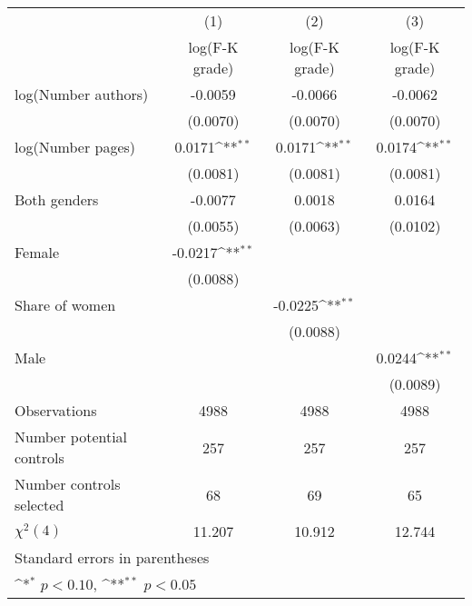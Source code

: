 {
\def\sym#1{\ifmmode^{#1}\else\(^{#1}\)\fi}
\begin{tabular}{l*{3}{c}}
\hline\hline
                    &\multicolumn{1}{c}{(1)}&\multicolumn{1}{c}{(2)}&\multicolumn{1}{c}{(3)}\\
                    &\multicolumn{1}{c}{log(F-K grade)}&\multicolumn{1}{c}{log(F-K grade)}&\multicolumn{1}{c}{log(F-K grade)}\\
\hline
\hspace{3mm}log(Number authors)&     -0.0059        &     -0.0066        &     -0.0062        \\
                    &    (0.0070)        &    (0.0070)        &    (0.0070)        \\
[1em]
\hspace{3mm}log(Number pages)&      0.0171\sym{**}&      0.0171\sym{**}&      0.0174\sym{**}\\
                    &    (0.0081)        &    (0.0081)        &    (0.0081)        \\
[1em]
\hspace{3mm}Both genders&     -0.0077        &      0.0018        &      0.0164        \\
                    &    (0.0055)        &    (0.0063)        &    (0.0102)        \\
[1em]
\hspace{3mm}Female  &     -0.0217\sym{**}&                    &                    \\
                    &    (0.0088)        &                    &                    \\
[1em]
\hspace{3mm}Share of women&                    &     -0.0225\sym{**}&                    \\
                    &                    &    (0.0088)        &                    \\
[1em]
\hspace{3mm}Male    &                    &                    &      0.0244\sym{**}\\
                    &                    &                    &    (0.0089)        \\
\hline
Observations        &        4988        &        4988        &        4988        \\
Number potential controls&         257        &         257        &         257        \\
Number controls selected&          68        &          69        &          65        \\
$\chi^2(4)$         &      11.207        &      10.912        &      12.744        \\
\hline\hline
\multicolumn{4}{l}{\footnotesize Standard errors in parentheses}\\
\multicolumn{4}{l}{\footnotesize \sym{*} \(p<0.10\), \sym{**} \(p<0.05\)}\\
\end{tabular}
}
